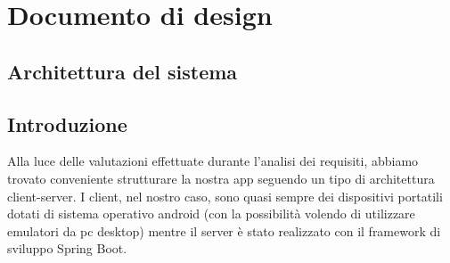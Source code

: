 \section{Documento di design}
    \subsection{Architettura del sistema}

    \subsection{Introduzione}
    \begin{flushleft}
        Alla luce delle valutazioni effettuate durante l'analisi dei requisiti, abbiamo trovato conveniente strutturare la nostra app seguendo un tipo di 
        architettura client-server. I client, nel nostro caso, sono quasi sempre dei dispositivi portatili dotati di sistema operativo android (con la possibilità volendo di utilizzare emulatori da pc desktop)
        mentre il server è stato realizzato con il framework di sviluppo Spring Boot.

    \end{flushleft}

